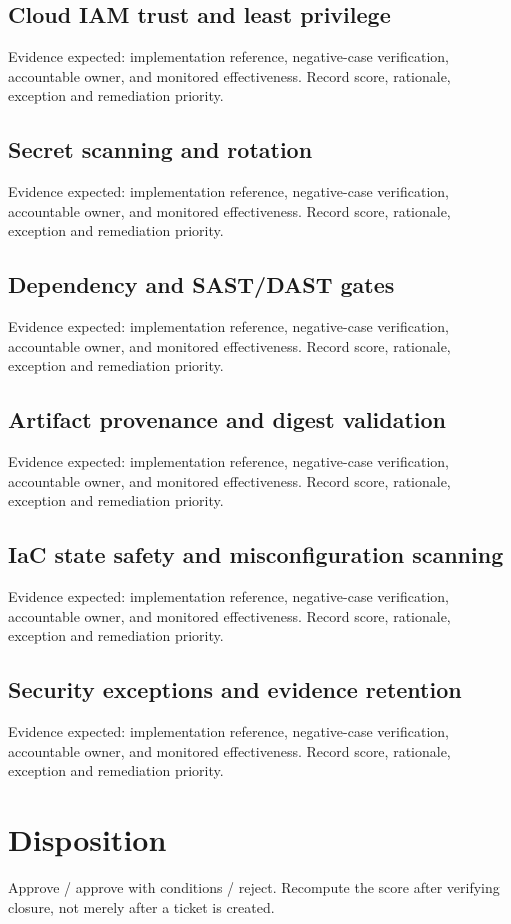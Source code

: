 \documentclass[10pt,letterpaper]{article}
\begin{document}
\subsection{Cloud IAM trust and least privilege}
Evidence expected: implementation reference, negative-case verification, accountable owner, and monitored effectiveness. Record score, rationale, exception and remediation priority.


\subsection{Secret scanning and rotation}
Evidence expected: implementation reference, negative-case verification, accountable owner, and monitored effectiveness. Record score, rationale, exception and remediation priority.


\subsection{Dependency and SAST/DAST gates}
Evidence expected: implementation reference, negative-case verification, accountable owner, and monitored effectiveness. Record score, rationale, exception and remediation priority.


\subsection{Artifact provenance and digest validation}
Evidence expected: implementation reference, negative-case verification, accountable owner, and monitored effectiveness. Record score, rationale, exception and remediation priority.


\subsection{IaC state safety and misconfiguration scanning}
Evidence expected: implementation reference, negative-case verification, accountable owner, and monitored effectiveness. Record score, rationale, exception and remediation priority.


\subsection{Security exceptions and evidence retention}
Evidence expected: implementation reference, negative-case verification, accountable owner, and monitored effectiveness. Record score, rationale, exception and remediation priority.


\section{Disposition}
Approve / approve with conditions / reject. Recompute the score after verifying closure, not merely after a ticket is created.
\end{document}

